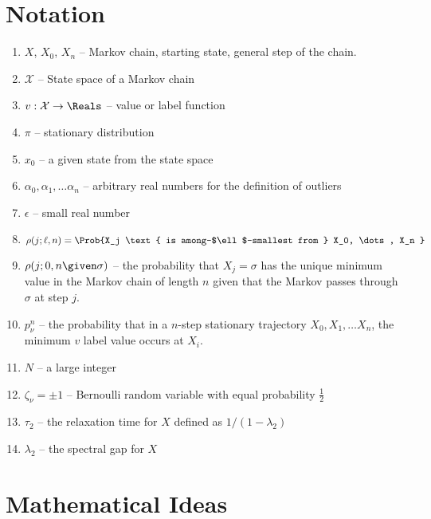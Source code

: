 \documentclass[12pt]{article}
\begin{document}
\section*{Notation}
\begin{enumerate}
    \item
        \( X \), \( X_0 \), \( X_n \) -- Markov chain, starting state,
        general step of the chain.
  \item \( \mathcal{X} \) -- State space of a Markov chain
  \item \( v :  \mathcal{X} \to \Reals \) -- value or label function
  \item \( \pi \) -- stationary distribution
  \item \( x_0 \) -- a given state from the state space
  \item \( \alpha_0, \alpha_1, \dots \alpha_n \) -- arbitrary real
    numbers for the definition of outliers
  \item \( \epsilon \) -- small real number
  \item \[
              \rho(j; \ell, n) = \Prob{X_j \text{ is
                  among-$\ell$-smallest from } X_0, \dots, X_n }
            \]
  \item   \( \rho(j; 0, n \given \sigma)
            \) -- the probability that \( X_j = \sigma \) has the unique
            minimum value in the Markov chain of length \( n \) given
            that the Markov passes through \( \sigma \) at step \( j
            \).
  \item \( p_{\nu}^n \) -- the
probability that in a \( n \)-step stationary trajectory \( X_0, X_1,
\dots X_n \), the minimum \( v \) label value occurs at \( X_i \).
\item \( N \) -- a large integer
\item \( \zeta_{\nu} = \pm 1 \)  --  Bernoulli random variable with
equal probability \( \frac{1}{2} \)
\item   \( \tau_2 \) -- the relaxation time
  for \( X \) defined as \( 1/ (1-\lambda_2) \) 
\item  \( \lambda_2 \) --  the spectral gap for \( X \)
\end{enumerate}

\section*{Mathematical Ideas}

\end{document}
